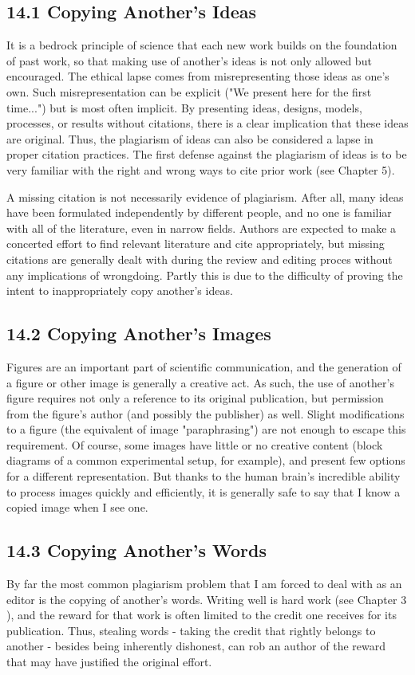 \subsection*{14.1 Copying Another's Ideas}
It is a bedrock principle of science that each new work builds on the foundation of past work, so that making use of another's ideas is not only allowed but encouraged. The ethical lapse comes from misrepresenting those ideas as one's own. Such misrepresentation can be explicit ("We present here for the first time...") but is most often implicit. By presenting ideas, designs, models, processes, or results without citations, there is a clear implication that these ideas are original. Thus, the plagiarism of ideas can also be considered a lapse in proper citation practices. The first defense against the plagiarism of ideas is to be very familiar with the right and wrong ways to cite prior work (see Chapter 5).

A missing citation is not necessarily evidence of plagiarism. After all, many ideas have been formulated independently by different people, and no one is familiar with all of the literature, even in narrow fields. Authors are expected to make a concerted effort to find relevant literature and cite appropriately, but missing citations are generally dealt with during the review and editing proces without any implications of wrongdoing. Partly this is due to the difficulty of proving the intent to inappropriately copy another's ideas.

\subsection*{14.2 Copying Another's Images}
Figures are an important part of scientific communication, and the generation of a figure or other image is generally a creative act. As such, the use of another's figure requires not only a reference to its original publication, but permission from the figure's author (and possibly the publisher) as well. Slight modifications to a figure (the equivalent of image "paraphrasing") are not enough to escape this requirement. Of course, some images have little or no creative content (block diagrams of a common experimental setup, for example), and present few options for a different representation. But thanks to the human brain's incredible ability to process images quickly and efficiently, it is generally safe to say that I know a copied image when I see one.

\subsection*{14.3 Copying Another's Words}
By far the most common plagiarism problem that I am forced to deal with as an editor is the copying of another's words. Writing well is hard work (see Chapter 3 ), and the reward for that work is often limited to the credit one receives for its publication. Thus, stealing words - taking the credit that rightly belongs to another - besides being inherently dishonest, can rob an author of the reward that may have justified the original effort.


